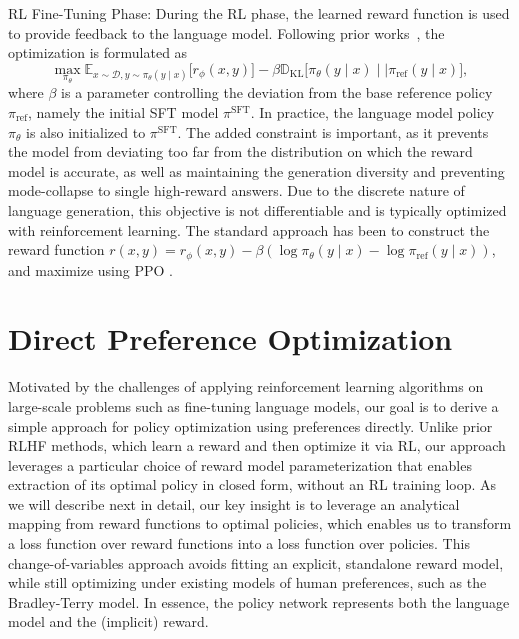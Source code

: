 \documentclass{article}
\begin{document}
RL Fine-Tuning Phase: During the RL phase, the learned reward function is used to provide feedback to the language model. Following prior works~\citep{jaques2017sequence, jaques2020human}, the optimization is formulated as
\begin{equation}\label{eq:RL}
\max_{\pi_{\theta}}  \mathbb{E}_{x\sim \mathcal{D}, y\sim \pi_{\theta}(y \mid x)}\bigl[r_{\phi}(x, y)\bigr] - \beta\mathbb{D}_{\textrm{KL}}\bigl[\pi_{\theta}(y\mid x)\mid \mid \pi_\text{ref}(y\mid x)\bigr],
\end{equation}
where $\beta$ is a parameter controlling the deviation from the base reference policy $\pi_\text{ref}$, namely the initial SFT model $\pi^\text{SFT}$.
In practice, the language model policy $\pi_\theta$ is also initialized to $\pi^\text{SFT}$. The added constraint is important, as it prevents the model from deviating too far from the distribution on which the reward model is accurate, as well as maintaining the generation diversity and preventing mode-collapse to single high-reward answers. Due to the discrete nature of language generation, this objective is not differentiable and is typically optimized with reinforcement learning. The standard approach \citep{ziegler2020finetuning, stiennon2022learning, bai2022training, ouyang2022training} has been to construct the reward function ${r(x, y) = r_{\phi}(x, y) -\beta (\log \pi_{\theta}(y\mid x) - \log \pi_\text{ref}(y\mid x))}$, and maximize using PPO \cite{schulman2017proximal}.

\section{Direct Preference Optimization}\label{sec:DPO}

Motivated by the challenges of applying reinforcement learning algorithms on large-scale problems such as fine-tuning language models, our goal is to derive a simple approach for policy optimization using preferences directly. Unlike prior RLHF methods, which learn a reward and then optimize it via RL, our approach leverages a particular choice of reward model parameterization that enables extraction of its optimal policy in closed form, without an RL training loop.
As we will describe next in detail, our key insight is to leverage an analytical mapping from reward functions to optimal policies, which enables us to transform a loss function over reward functions into a loss function over policies.
This change-of-variables approach avoids fitting an explicit, standalone reward model, while still optimizing under existing models of human preferences, such as the Bradley-Terry model. In essence, the policy network represents both the language model and the (implicit) reward.
\end{document}
